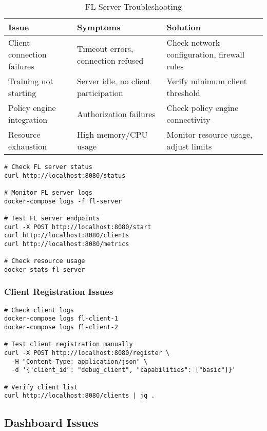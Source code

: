 \begin{table}[H]
\centering
\caption{FL Server Troubleshooting}
\label{tab:fl-server-issues}
\begin{tabularx}{\textwidth}{@{}lXX@{}}
\toprule
\textbf{Issue} & \textbf{Symptoms} & \textbf{Solution} \\
\midrule
Client connection failures & Timeout errors, connection refused & Check network configuration, firewall rules \\
Training not starting & Server idle, no client participation & Verify minimum client threshold \\
Policy engine integration & Authorization failures & Check policy engine connectivity \\
Resource exhaustion & High memory/CPU usage & Monitor resource usage, adjust limits \\
\bottomrule
\end{tabularx}
\end{table}

\begin{lstlisting}[style=bashcode, caption=FL Server Diagnostics]
# Check FL server status
curl http://localhost:8080/status

# Monitor FL server logs
docker-compose logs -f fl-server

# Test FL server endpoints
curl -X POST http://localhost:8080/start
curl http://localhost:8080/clients
curl http://localhost:8080/metrics

# Check resource usage
docker stats fl-server
\end{lstlisting}

\subsubsection{Client Registration Issues}

\begin{lstlisting}[style=bashcode, caption=Client Registration Debugging]
# Check client logs
docker-compose logs fl-client-1
docker-compose logs fl-client-2

# Test client registration manually
curl -X POST http://localhost:8080/register \
  -H "Content-Type: application/json" \
  -d '{"client_id": "debug_client", "capabilities": ["basic"]}'

# Verify client list
curl http://localhost:8080/clients | jq .
\end{lstlisting}

\subsection{Dashboard Issues}

